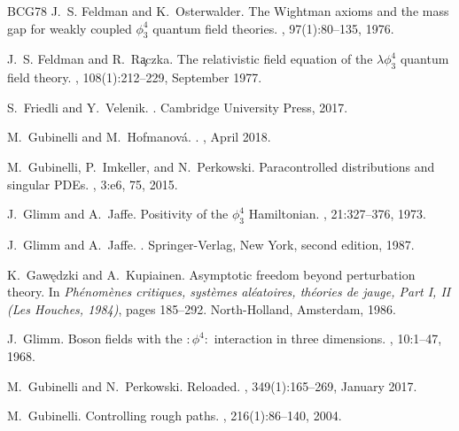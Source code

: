 \documentclass[a4paper,11pt]{article}
\numberwithin{equation}{section}
\begin{document}
\begin{thebibliography}{BCG{\etalchar{+}}78}
J.~S. Feldman and K.~Osterwalder.
\newblock The {Wightman} axioms and the mass gap for weakly coupled $\phi^4_3$
  quantum field theories.
, 97(1):80--135, 1976.

J.~S. Feldman and R.~R\c{a}czka.
\newblock The relativistic field equation of the $\lambda\phi^4_3$ quantum
  field theory.
, 108(1):212--229, September 1977.

S.~Friedli and Y.~Velenik.
.
\newblock Cambridge University Press, 2017.

M.~{Gubinelli} and M.~{Hofmanov{\'a}}.
.
, April 2018.

M.~Gubinelli, P.~Imkeller, and N.~Perkowski.
\newblock Paracontrolled distributions and singular {PDEs}.
, 3:e6, 75, 2015.

J.~Glimm and A.~Jaffe.
\newblock Positivity of the $\phi^4_3$ {Hamiltonian}.
, 21:327--376,
  1973.

J.~Glimm and A.~Jaffe.
.
\newblock Springer-Verlag, New York, second edition, 1987.

K.~Gaw\k{e}dzki and A.~Kupiainen.
\newblock Asymptotic freedom beyond perturbation theory.
\newblock In {\em Ph\'enom\`enes critiques, syst\`emes al\'eatoires, th\'eories
  de jauge, {Part} {I}, {II} ({Les} {Houches}, 1984)}, pages 185--292.
  North-Holland, Amsterdam, 1986.

J.~Glimm.
\newblock Boson fields with the $:\phi^4:$ interaction in three dimensions.
, 10:1--47, 1968.

M.~Gubinelli and N.~Perkowski.
 {Reloaded}.
, 349(1):165--269,
  January 2017.

M.~Gubinelli.
\newblock Controlling rough paths.
, 216(1):86--140, 2004.


\end{thebibliography}
\end{document}

